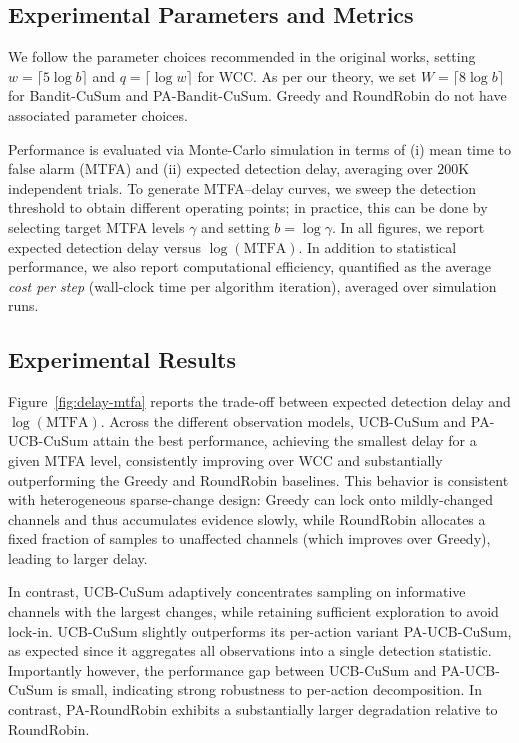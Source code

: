 \documentclass[letterpaper, 10 pt, conference]{ieeeconf}  %
\begin{document}
\subsection{Experimental Parameters and Metrics} 
We follow the parameter choices recommended in the original works, setting $w=\lceil 5\log b \rceil$ and $q=\lceil \log w\rceil$ for WCC. As per our theory, we set $W=\lceil 8\log b \rceil$ for Bandit-CuSum and PA-Bandit-CuSum. 
Greedy and RoundRobin do not have associated parameter choices.

Performance is evaluated via Monte-Carlo simulation in terms of (i) mean time to false alarm (MTFA) and (ii) expected detection delay, averaging over $200$K independent trials.
To generate MTFA--delay curves, we sweep the detection threshold to obtain different operating points; in practice, this can be done by selecting target MTFA levels $\gamma$ and setting $b=\log\gamma$.
In all figures, we report expected detection delay versus $\log(\mathrm{MTFA})$. In addition to statistical performance, we also report computational efficiency, quantified as the average \emph{cost per step} (wall-clock time per algorithm iteration), averaged over simulation runs.

\subsection{Experimental Results} 
Figure~\ref{fig:delay-mtfa} reports the trade-off between expected detection delay and $\log(\mathrm{MTFA})$. Across the different observation models, UCB-CuSum and PA-UCB-CuSum attain the best performance, achieving the smallest delay for a given MTFA level, consistently improving over WCC and substantially outperforming the Greedy and RoundRobin baselines. This behavior is consistent with heterogeneous sparse-change design: Greedy can lock onto mildly-changed channels and thus accumulates evidence slowly, while RoundRobin allocates a fixed fraction of samples to unaffected channels (which improves over Greedy), leading to larger delay. 

In contrast, UCB-CuSum adaptively concentrates sampling on informative channels with the largest changes, while retaining sufficient exploration to avoid lock-in. UCB-CuSum slightly outperforms its per-action variant PA-UCB-CuSum, as expected since it aggregates all observations into a single detection statistic. Importantly however, the performance gap between UCB-CuSum and PA-UCB-CuSum is small, indicating strong robustness to per-action decomposition. In contrast, PA-RoundRobin exhibits a substantially larger degradation relative to RoundRobin.
\end{document}
